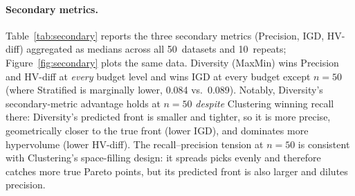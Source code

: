 \documentclass[sigconf,nonacm]{acmart}
\begin{document}
\paragraph{Secondary metrics.}
Table~\ref{tab:secondary} reports the three secondary metrics (Precision,
IGD, HV-diff) aggregated as medians across all 50~datasets and 10~repeats;
Figure~\ref{fig:secondary} plots the same data.
Diversity (MaxMin) wins Precision and HV-diff at \emph{every} budget
level and wins IGD at every budget except $n=50$ (where Stratified is
marginally lower, 0.084 vs.\ 0.089).
Notably, Diversity's secondary-metric advantage holds at $n=50$
\emph{despite} Clustering winning recall there: Diversity's predicted front
is smaller and tighter, so it is more precise, geometrically closer to the
true front (lower IGD), and dominates more hypervolume (lower HV-diff).
The recall--precision tension at $n=50$ is consistent with Clustering's
space-filling design: it spreads picks evenly and therefore catches more
true Pareto points, but its predicted front is also larger and dilutes
precision.
\end{document}
